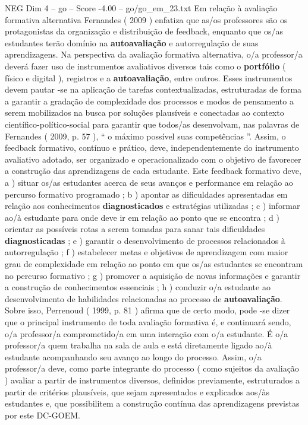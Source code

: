 \begin{textsample}{NEG Dim 4 – go – Score -4.00 – go/go\_em\_23.txt}
Em relação à avaliação formativa alternativa Fernandes ( 2009 ) enfatiza que as/os professores são os protagonistas da organização e distribuição de feedback, enquanto que os/as estudantes terão domínio na \textbf{autoavaliação} e autorregulação de suas aprendizagens.
Na perspectiva da avaliação formativa alternativa, o/a professor/a deverá fazer uso de instrumentos avaliativos diversos tais como o \textbf{portfólio} ( físico e digital ), registros e a \textbf{autoavaliação}, entre outros.
Esses instrumentos devem pautar -se na aplicação de tarefas contextualizadas, estruturadas de forma a garantir a gradação de complexidade dos processos e modos de pensamento a serem mobilizados na busca por soluções plausíveis e conectadas ao contexto científico-político-social para garantir que todos/as desenvolvam, nas palavras de Fernandes ( 2009, p. 57 ), “ o máximo possível suas competências ”.
Assim, o feedback formativo, contínuo e prático, deve, independentemente do instrumento avaliativo adotado, ser organizado e operacionalizado com o objetivo de favorecer a construção das aprendizagens de cada estudante.
Este feedback formativo deve, a ) situar os/as estudantes acerca de seus avanços e performance em relação ao percurso formativo programado ; b ) apontar as dificuldades apresentadas em relação aos conhecimentos \textbf{diagnosticados} e estratégias utilizadas ; c ) informar ao/à estudante para onde deve ir em relação ao ponto que se encontra ; d ) orientar as possíveis rotas a serem tomadas para sanar tais dificuldades \textbf{diagnosticadas} ; e ) garantir o desenvolvimento de processos relacionados à autorregulação ; f ) estabelecer metas e objetivos de aprendizagem com maior grau de complexidade em relação ao ponto em que os/as estudantes se encontram no percurso formativo ; g ) promover a aquisição de novas informações e garantir a construção de conhecimentos essenciais ; h ) conduzir o/a estudante ao desenvolvimento de habilidades relacionadas ao processo de \textbf{autoavaliação}.
Sobre isso, Perrenoud ( 1999, p. 81 ) afirma que de certo modo, pode -se dizer que o principal instrumento de toda avaliação formativa é, e continuará sendo, o/a professor/a comprometido/a em uma interação com o/a estudante.
É o/a professor/a quem trabalha na sala de aula e está diretamente ligado ao/à estudante acompanhando seu avanço ao longo do processo.
Assim, o/a professor/a deve, como parte integrante do processo ( como sujeitos da avaliação ) avaliar a partir de instrumentos diversos, definidos previamente, estruturados a partir de critérios plausíveis, que sejam apresentados e explicados aos/às estudantes e, que possibilitem a construção contínua das aprendizagens previstas por este DC-GOEM.

\end{textsample}
